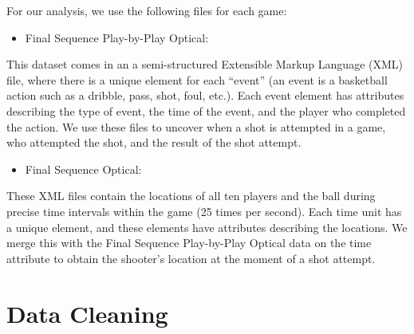 \documentclass[12pt,twoside]{dukestatscithesis}
\providecommand{\tightlist}{%
  \setlength{\itemsep}{0pt}\setlength{\parskip}{0pt}}
\theoremstyle{definition}
\theoremstyle{definition}
\theoremstyle{definition}
\theoremstyle{remark}
\begin{document}
For our analysis, we use the following files for each game:
\begin{itemize}
\tightlist
\item
  Final Sequence Play-by-Play Optical:
\end{itemize}
This dataset comes in an a semi-structured Extensible Markup Language
(XML) file, where there is a unique element for each ``event'' (an event
is a basketball action such as a dribble, pass, shot, foul, etc.). Each
event element has attributes describing the type of event, the time of
the event, and the player who completed the action. We use these files
to uncover when a shot is attempted in a game, who attempted the shot,
and the result of the shot attempt.
\begin{itemize}
\tightlist
\item
  Final Sequence Optical:
\end{itemize}
These XML files contain the locations of all ten players and the ball
during precise time intervals within the game (25 times per second).
Each time unit has a unique element, and these elements have attributes
describing the locations. We merge this with the Final Sequence
Play-by-Play Optical data on the time attribute to obtain the shooter's
location at the moment of a shot attempt.

\section{Data Cleaning}\label{data-cleaning}
\end{document}
